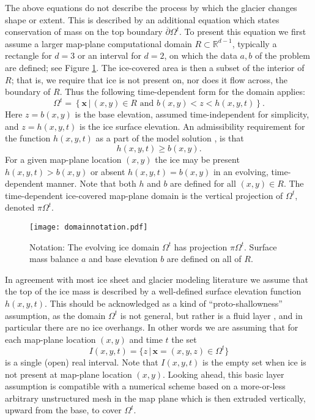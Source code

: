\documentclass[letterpaper,final,12pt,reqno]{amsart}
\newcommand{\RR}{\mathbb{R}}
\newcommand{\bx}{\mathbf{x}}
\begin{document}
The above equations do not describe the process by which the glacier changes shape or extent.  This is described by an additional equation which states conservation of mass on the top boundary $\overline{\partial} \Omega^t$.  To present this equation we first assume a larger map-plane computational domain $R\subset \RR^{d-1}$, typically a rectangle for $d=3$ or an interval for $d=2$, on which the data $a,b$ of the problem are defined; see Figure \ref{fig:domainnotation}.  The ice-covered area is then a subset of the interior of $R$; that is, we require that ice is not present on, nor does it flow across, the boundary of $R$.  Thus the following time-dependent form for the domain applies:
\begin{equation}
\Omega^t = \left\{\bx\,\big|\,(x,y)\in R \text{ and } b(x,y) < z < h(x,y,t)\right\}.  \label{Omegat}
\end{equation}
Here $z=b(x,y)$ is the base elevation, assumed time-independent for simplicity, and $z=h(x,y,t)$ is the ice surface elevation.  An admissibility requirement for the function $h(x,y,t)$ as a part of the model solution \cite{Bueler2016}, is that
\begin{equation}
h(x,y,t) \ge b(x,y).  \label{admissibility}
\end{equation}
For a given map-plane location $(x,y)$ the ice may be present $h(x,y,t)>b(x,y)$ or absent $h(x,y,t)=b(x,y)$ in an evolving, time-dependent manner.  Note that both $h$ and $b$ are defined for all $(x,y)\in R$.  The time-dependent ice-covered map-plane domain is the vertical projection of $\Omega^t$, denoted $\pi \Omega^t$.

\begin{figure}[h]
\begin{center}
\texttt{[image: domainnotation.pdf]}
\end{center}
\caption{Notation: The evolving ice domain $\Omega^t$ has projection $\pi \Omega^t$.  Surface mass balance $a$ and base elevation $b$ are defined on all of $R$.}
\label{fig:domainnotation}
\end{figure}



In agreement with most ice sheet and glacier modeling literature we assume that the top of the ice mass is described by a well-defined surface elevation function $h(x,y,t)$.  This should be acknowledged as a kind of ``proto-shallowness'' assumption, as the domain $\Omega^t$ is not general, but rather is a fluid layer \cite{Bueler2020}, and in particular there are no ice overhangs.  In other words we are assuming that for each map-plane location $(x,y)$ and time $t$ the set
\begin{equation}
I(x,y,t) = \{z\,\big|\,\bx=(x,y,z) \in \Omega^t\} \label{intervalassume}
\end{equation}
is a single (open) real interval.  Note that $I(x,y,t)$ is the empty set when ice is not present at map-plane location $(x,y)$.  Looking ahead, this basic layer assumption is compatible with a numerical scheme based on a more-or-less arbitrary unstructured mesh in the map plane which is then extruded vertically, upward from the base, to cover $\Omega^t$.
\end{document}
